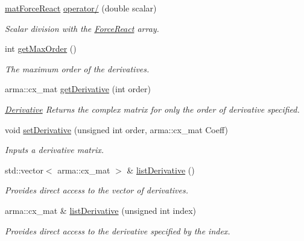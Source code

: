 \begin{DoxyCompactItemize}
\hyperlink{classosea_1_1ofreq_1_1mat_force_react}{mat\-Force\-React} \hyperlink{classosea_1_1ofreq_1_1mat_force_react_a25626e49af1c89c772e8225b07035779}{operator/} (double scalar)
\begin{DoxyCompactList}\small\item\em Scalar division with the \hyperlink{classosea_1_1ofreq_1_1_force_react}{Force\-React} array. \end{DoxyCompactList}\item 
int \hyperlink{classosea_1_1ofreq_1_1mat_force_react_aa163ad7393a29dc15fc2c490f88ef5cd}{get\-Max\-Order} ()
\begin{DoxyCompactList}\small\item\em The maximum order of the derivatives. \end{DoxyCompactList}\item 
arma\-::cx\-\_\-mat \hyperlink{classosea_1_1ofreq_1_1mat_force_react_a916eb8547f09eb3bf67092f0f64ac59c}{get\-Derivative} (int order)
\begin{DoxyCompactList}\small\item\em \hyperlink{classosea_1_1ofreq_1_1_derivative}{Derivative} Returns the complex matrix for only the order of derivative specified. \end{DoxyCompactList}\item 
void \hyperlink{classosea_1_1ofreq_1_1mat_force_react_aab3ce2d56835cfac91cd019f3a7db021}{set\-Derivative} (unsigned int order, arma\-::cx\-\_\-mat Coeff)
\begin{DoxyCompactList}\small\item\em Inputs a derivative matrix. \end{DoxyCompactList}\item 
std\-::vector$<$ arma\-::cx\-\_\-mat $>$ \& \hyperlink{classosea_1_1ofreq_1_1mat_force_react_a52f785374b8e9b6e4d33e0eac95c8622}{list\-Derivative} ()
\begin{DoxyCompactList}\small\item\em Provides direct access to the vector of derivatives. \end{DoxyCompactList}\item 
arma\-::cx\-\_\-mat \& \hyperlink{classosea_1_1ofreq_1_1mat_force_react_af05d5675a035a111264a37472e9ba479}{list\-Derivative} (unsigned int index)
\begin{DoxyCompactList}\small\item\em Provides direct access to the derivative specified by the index. \end{DoxyCompactList}\item 

\end{DoxyCompactItemize}
